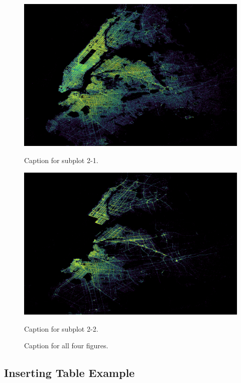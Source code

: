 \documentclass[a4paper, 11pt]{article}
\begin{document}
\begin{figure}[H]
        \medskip

        \begin{minipage}{0.45\textwidth}
            \centering
            \includegraphics[width=\linewidth]{../graphs/subplot21}
            \caption{Caption for subplot 2-1.}
          \label{fig:subplot21}
          \end{minipage}
        \hfill
        \begin{minipage}{0.45\textwidth}
            \centering
        \includegraphics[width=\linewidth]{../graphs/subplot22}
        \caption{Caption for subplot 2-2.}
        \label{fig:subplot22}
        \end{minipage}

\caption{Caption for all four figures.}
\label{fig:all4plots}
\end{figure}


\subsection{Inserting Table Example}
\end{document}
